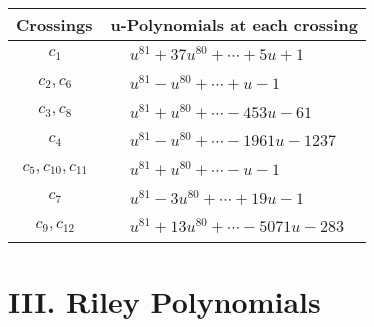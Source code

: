 \documentclass[1p]{elsarticle_modified}
\theoremstyle{definition}
\begin{document}
\begin{tabular}{m{50pt}|m{274pt}}
Crossings & \hspace{64pt}u-Polynomials at each crossing \\
\hline $$\begin{aligned}c_{1}\end{aligned}$$&$\begin{aligned}
&u^{81}+37 u^{80}+\cdots+5 u+1
\end{aligned}$\\
\hline $$\begin{aligned}c_{2},c_{6}\end{aligned}$$&$\begin{aligned}
&u^{81}- u^{80}+\cdots+u-1
\end{aligned}$\\
\hline $$\begin{aligned}c_{3},c_{8}\end{aligned}$$&$\begin{aligned}
&u^{81}+u^{80}+\cdots-453 u-61
\end{aligned}$\\
\hline $$\begin{aligned}c_{4}\end{aligned}$$&$\begin{aligned}
&u^{81}- u^{80}+\cdots-1961 u-1237
\end{aligned}$\\
\hline $$\begin{aligned}c_{5},c_{10},c_{11}\end{aligned}$$&$\begin{aligned}
&u^{81}+u^{80}+\cdots- u-1
\end{aligned}$\\
\hline $$\begin{aligned}c_{7}\end{aligned}$$&$\begin{aligned}
&u^{81}-3 u^{80}+\cdots+19 u-1
\end{aligned}$\\
\hline $$\begin{aligned}c_{9},c_{12}\end{aligned}$$&$\begin{aligned}
&u^{81}+13 u^{80}+\cdots-5071 u-283
\end{aligned}$\\
\hline
\end{tabular}\newpage\renewcommand{\arraystretch}{1}
\centering \section*{ III. Riley Polynomials}
\end{document}
